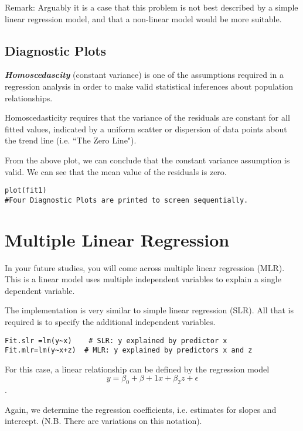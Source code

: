Remark: Arguably it is a case that this problem is not best described by a simple linear regression model, and that a non-linear model would be more suitable.

\subsection{Diagnostic Plots}
\textbf{\emph{Homoscedascity }}(constant variance) is one of the assumptions required in a regression analysis in order to make valid statistical inferences about population relationships.

Homoscedasticity requires that the variance of the residuals are constant for all fitted values, indicated by a uniform scatter or dispersion of data points about the trend line (i.e. ``The Zero Line").

From the above plot, we can conclude that the constant variance assumption is valid. We can see that the mean value of the residuals is zero.
\begin{framed}
\begin{verbatim}
plot(fit1)
#Four Diagnostic Plots are printed to screen sequentially.
\end{verbatim}
\end{framed}
\newpage
\section{Multiple Linear Regression}
In your future studies, you will come across multiple linear regression (MLR). This is a linear model uses multiple independent variables to explain a single dependent variable.

The implementation is very similar to simple linear regression (SLR). All that is required is to specify the additional independent variables.

\begin{framed}
\begin{verbatim}
Fit.slr =lm(y~x)  	# SLR: y explained by predictor x
Fit.mlr=lm(y~x+z)  # MLR: y explained by predictors x and z
\end{verbatim}
\end{framed}

For this case, a  linear relationship can be defined by the regression model  \[y =\beta_0 + \beta+1x + \beta_2z + \epsilon\].

Again, we determine the regression coefficients, i.e. estimates for slopes and intercept. (N.B. There are variations on this notation).


